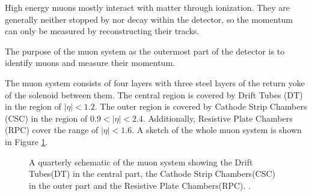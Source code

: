 High energy muons mostly interact with matter through ionization.
They are generally neither stopped by nor decay within the detector, so the momentum can only be measured by reconstructing their tracks.

The purpose of the muon system as the outermost part of the detector is to identify muons and measure their momentum.

The muon system \cite{Bayatian:922757} consists of four layers with three steel layers of the return yoke of the solenoid between them.
The central region is covered by Drift Tubes (DT) in the region of $|\eta|< 1.2$. The outer region is covered by Cathode Strip Chambers (CSC) in the region of $0.9<|\eta|<2.4$.
Additionally, Resistive Plate Chambers (RPC) cover the range of $|\eta|<1.6$.
A sketch of the whole muon system is shown in Figure \ref{fig:det_muon}.

\begin{figure}[htbp!]
  \begin{center}

\caption{A quarterly schematic of the muon system showing the Drift Tubes(DT) in the central part, the Cathode Strip Chambers(CSC) in the outer part and the Resistive Plate Chambers(RPC). \cite{Bayatian:922757}.
  \label{fig:det_muon}}
  \end{center}
\end{figure}

